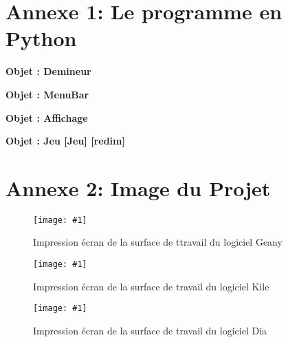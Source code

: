 \documentclass[a4paper,11pt]{article}
\newcommand{\moncode}[1]{}
\newcommand{\monimage}[4]{
\par\noindent
\begin{figure}[H] %
\begin{center}
\texttt{[image: \#1]} %
\caption{#2} %
\label{#3} %
\end{center}
\end{figure} %
}
\newcommand{\ml}[0]{\par\noindent}
\begin{document}
 \section*{Annexe 1: Le programme en Python{\label{annexe_un}}}
 \moncode{parametre.py}
% 
 \moncode{ProgrammePrincipal.py}
% 
 \ml
 \bf{Objet : } Demineur
 \par\noindent
\moncode{Demineur.py}
\moncode{options.py}
\moncode{pmines.py}
\moncode{majColonnes.py}
\moncode{majLignes.py}
\moncode{couleur.py}
\moncode{fond.py}
\moncode{mode.py}
\moncode{sauver.py}
\moncode{ouvrir.py}
\moncode{reset.py}
\moncode{principe.py}
\moncode{aPropos.py}

\ml
\bf{Objet : } MenuBar
\moncode{MenuBar.py}

\ml
\bf{Objet : } Affichage
\moncode{Affichage.py}

\ml
\bf{Objet : } Jeu
\moncode{Jeu.py}[Jeu]
\moncode{redim.py}[redim]
\moncode{initGrille.py}
\moncode{traceMaGrille.py}
\moncode{clicDroit.py}
\moncode{clicGauche.py}
\moncode{liberer.py}
\moncode{gagne.py}
\moncode{traceGrille.py}

\newpage

\section*{Annexe 2: Image du Projet{\label{annexe:deux}}}
\monimage{plantravail.png}{Impression écran de la surface de ttravail du logiciel Geany}{GEANY}{15}
\monimage{latex.png}{Impression écran de la surface de travail du logiciel Kile}{KILE}{15}
\monimage{dia.png}{Impression écran de la surface de travail du logiciel Dia}{DIA}{15}

\tableofcontents
\listoffigures
\end{document}
